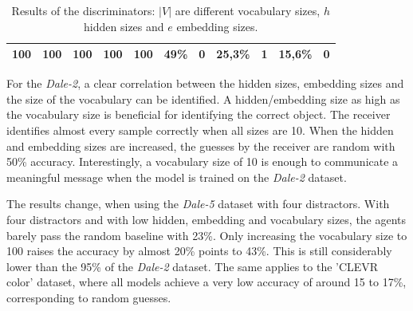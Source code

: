 \begin{table}[h]
\begin{tabular}{ccccc|cc|cc|cc}
        {100} & {100}   & {100}   & {100}   & {100}   & {49\%}                              & {0}                                 & {25,3\%}                                 & {1}             & {15,6\%}          & {0}             \\
        \bottomrule
    \end{tabular}
    \caption{Results of the discriminators: $|V|$ are different vocabulary sizes, $h$ hidden sizes and $e$ embedding sizes.}
    \label{tab:results_discriminator}
\end{table}

For the \emph{Dale-2}, a clear correlation between the hidden sizes, embedding sizes and the size of the vocabulary can be identified.
A hidden/embedding size as high as the vocabulary size is beneficial for identifying the correct object.
The receiver identifies almost every sample correctly when all sizes are 10.
When the hidden and embedding sizes are increased, the guesses by the receiver are random with 50\% accuracy.
Interestingly, a vocabulary size of 10 is enough to communicate a meaningful message when the model is trained on the \emph{Dale-2} dataset.

The results change, when using the \emph{Dale-5} dataset with four distractors.
With four distractors and with low hidden, embedding and vocabulary sizes, the agents barely pass the random baseline with 23\%.
Only increasing the vocabulary size to 100 raises the accuracy by almost 20\% points to 43\%.
This is still considerably lower than the 95\% of the \emph{Dale-2} dataset.
The same applies to the 'CLEVR color' dataset, where all models achieve a very low accuracy of around 15 to 17\%, corresponding to random guesses.

